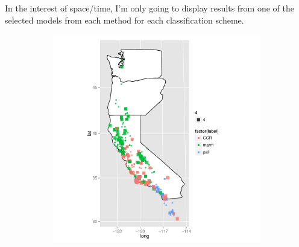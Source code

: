 \documentclass{article}\usepackage{graphicx, color}
\makeatletter
\newenvironment{kframe}{%
 \def\at@end@of@kframe{}%
 \ifinner\ifhmode%
  \def\at@end@of@kframe{\end{minipage}}%
  \begin{minipage}{\columnwidth}%
 \fi\fi%
 \def\FrameCommand##1{\hskip\@totalleftmargin \hskip-\fboxsep
 \colorbox{shadecolor}{##1}\hskip-\fboxsep
     \hskip-\linewidth \hskip-\@totalleftmargin \hskip\columnwidth}%
 \MakeFramed {\advance\hsize-\width
   \@totalleftmargin\z@ \linewidth\hsize
   \@setminipage}}%
 {\par\unskip\endMakeFramed%
 \at@end@of@kframe}
\newenvironment{knitrout}{}{} %
\makeatother
\begin{document}
In the interest of space/time, I'm only going to display results from one of the selected models from each method for each classification scheme.

\begin{knitrout}
\color{fgcolor}\begin{kframe}


{\ttfamily\noindent\bfseries\color{errorcolor}{\#\# Error: object 'turtle.train' not found}}

{\ttfamily\noindent\bfseries\color{errorcolor}{\#\# Error: object 'tm.map' not found}}\end{kframe}
\end{knitrout}


\begin{figure}[t]
  \centering
  \begin{subfigure}[b]{0.5\textwidth}
    \centering
    \caption{}
    \includegraphics[width = \textwidth]{figure/multi-map1}
    \label{fig:multi-map1}
  \end{subfigure}%
  \begin{subfigure}[b]{0.5\textwidth}
    \centering
    \caption{}

\end{subfigure}
\end{figure}
\end{document}
